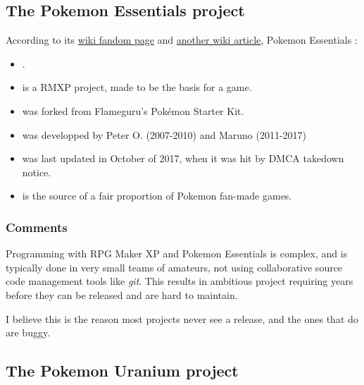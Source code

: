 \documentclass[11pt]{article}
\begin{document}
\subsection{The Pokemon Essentials project}


According to its \href{https://essentialsdocs.fandom.com/wiki/Essentials_Docs_Wiki}{wiki fandom page} and \href{https://pokemon-fan-game.fandom.com/wiki/Pok\%C3\%A9mon_Essentials}{another wiki article}, Pokemon Essentials : 

\begin{itemize}
	\item {}.
	\item is a RMXP project, made to be the basis for a game.
	\item was forked from Flameguru's Pokémon Starter Kit.
	\item was developped by Peter O. (2007-2010) and Maruno (2011-2017)
	\item was last updated in October of 2017, when it was hit by DMCA takedown notice.
	\item is the source of a fair proportion of Pokemon fan-made games.
\end{itemize}






\subsubsection{Comments}

Programming with RPG Maker XP and Pokemon Essentials is complex, and is typically done in very small teams of amateurs, not using collaborative source code management tools like \textit{git}. This results in ambitious project requiring years before they can be released and are hard to maintain.

I believe this is the reason most projects never see a release, and the ones that do are buggy.




\subsection{The Pokemon Uranium project}
\end{document}
